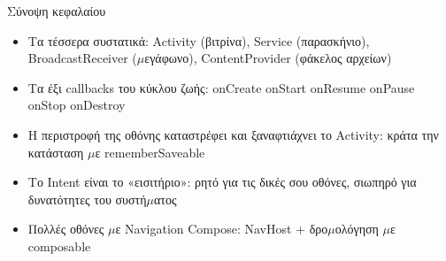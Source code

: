 \begin{tcbsummary}{Σύνοψη κεφαλαίου}
\begin{itemize}
  \item Τα τέσσερα συστατικά: Activity (βιτρίνα), Service (παρασκήνιο), BroadcastReceiver ($\mu$εγάφωνο), ContentProvider (φάκελος αρχείων)
  \item Τα έξι callbacks του κύκλου ζωής: onCreate onStart onResume onPause onStop onDestroy
  \item Η περιστροφή της οθόνης καταστρέφει και ξαναφτιάχνει το Activity: κράτα την κατάσταση $\mu$ε rememberSaveable
  \item Το Intent είναι το «εισιτήριο»: ρητό για τις δικές σου οθόνες, σιωπηρό για δυνατότητες του συστή$\mu$ατος
  \item Πολλές οθόνες $\mu$ε Navigation Compose: NavHost + δρο$\mu$ολόγηση $\mu$ε composable
\end{itemize}

\end{tcbsummary}
